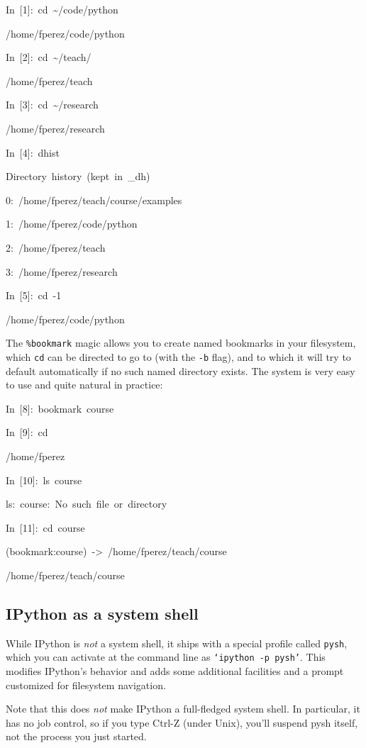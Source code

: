 \begin{lyxcode}
In~{[}1]:~cd~\textasciitilde{}/code/python

/home/fperez/code/python

In~{[}2]:~cd~\textasciitilde{}/teach/

/home/fperez/teach

In~{[}3]:~cd~\textasciitilde{}/research

/home/fperez/research

In~{[}4]:~dhist

Directory~history~(kept~in~\_dh)

0:~/home/fperez/teach/course/examples

1:~/home/fperez/code/python

2:~/home/fperez/teach

3:~/home/fperez/research

In~{[}5]:~cd~-1

/home/fperez/code/python
\end{lyxcode}
The \texttt{\%bookmark} magic allows you to create named bookmarks
in your filesystem, which \texttt{cd} can be directed to go to (with
the \texttt{-b} flag), and to which it will try to default automatically
if no such named directory exists. The system is very easy to use
and quite natural in practice:

\begin{lyxcode}
In~{[}8]:~bookmark~course

In~{[}9]:~cd

/home/fperez

In~{[}10]:~ls~course

ls:~course:~No~such~file~or~directory

In~{[}11]:~cd~course

(bookmark:course)~->~/home/fperez/teach/course

/home/fperez/teach/course
\end{lyxcode}

\subsection{IPython as a system shell}

While IPython is \emph{not} a system shell, it ships with a special
profile called \texttt{pysh}, which you can activate at the command
line as \texttt{`ipython -p pysh'}. This modifies IPython's behavior
and adds some additional facilities and a prompt customized for filesystem
navigation.

Note that this does \emph{not} make IPython a full-fledged system
shell. In particular, it has no job control, so if you type Ctrl-Z
(under Unix), you'll suspend pysh itself, not the process you just
started. 

